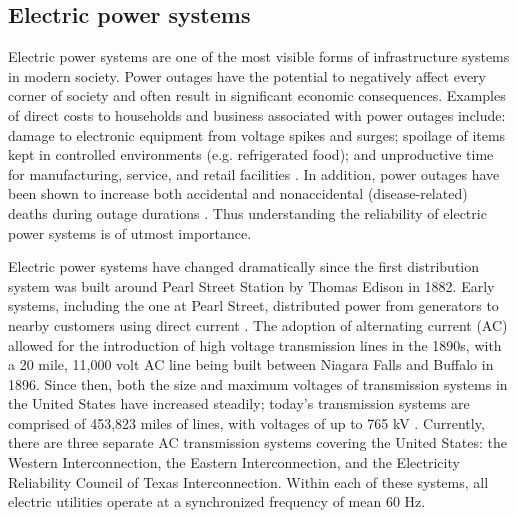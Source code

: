 
\subsection{Electric power systems}
\label{sec:ch1:powerreliability:background}

Electric power systems are one of the most visible forms of infrastructure systems in modern society.  Power outages have the potential to negatively affect every corner of society and often result in significant economic consequences.  Examples of direct costs to households and business associated with power outages include: damage to electronic equipment from voltage spikes and surges; spoilage of items kept in controlled environments (e.g. refrigerated food); and unproductive time for manufacturing, service, and retail facilities \cite{ASCE2011}.  In addition, power outages have been shown to increase both accidental and nonaccidental (disease-related) deaths during outage durations \cite{Anderson2012}.  Thus understanding the reliability of electric power systems is of utmost importance.

Electric power systems have changed dramatically since the first distribution system was built around Pearl Street Station by Thomas Edison in 1882.  Early systems, including the one at Pearl Street, distributed power from generators to nearby customers using direct current \cite{Brown2004}.  The adoption of alternating current (AC) allowed for the introduction of high voltage transmission lines in the 1890s, with a 20 mile, 11,000 volt AC line being built between Niagara Falls and Buffalo in 1896.  Since then, both the size and maximum voltages of transmission systems in the United States have increased steadily; today's transmission systems are comprised of 453,823 miles of lines, with voltages of up to 765 kV \cite{Brown2004,NERC2010}. Currently, there are three separate AC transmission systems covering the United States: the Western Interconnection, the Eastern Interconnection, and the Electricity Reliability Council of Texas Interconnection.  Within each of these systems, all electric utilities operate at a synchronized frequency of mean 60 Hz.

